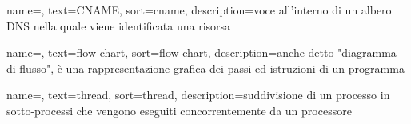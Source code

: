 {
    name=,
    text=CNAME,
    sort=cname, 
    description={voce all'interno di un albero DNS nella quale viene identificata una risorsa}
}

{
    name=,
    text=flow-chart,
    sort=flow-chart, 
    description={anche detto "diagramma di flusso", è una rappresentazione grafica dei passi ed istruzioni di un programma}
}

{
    name=,
    text=thread,
    sort=thread, 
    description={suddivisione di un processo in sotto-processi che vengono eseguiti concorrentemente da un processore}
}

